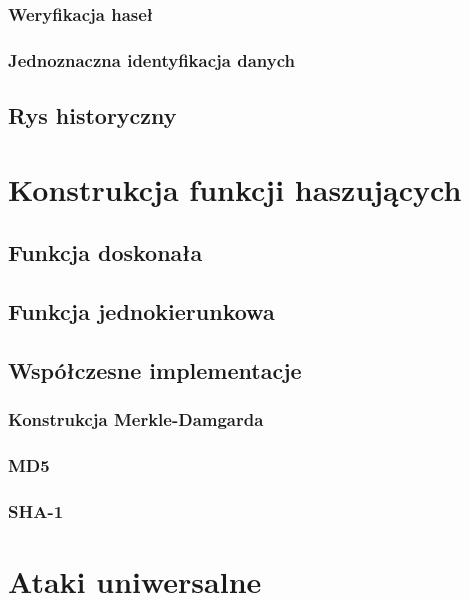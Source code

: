 \documentclass[12pt,a4paper,twoside]{article}
\begin{document}
\subsubsection{Weryfikacja haseł}

\subsubsection{Jednoznaczna identyfikacja danych}



\newpage

\subsection{Rys historyczny}

\section{Konstrukcja funkcji haszujących}

\subsection{Funkcja doskonała}

\subsection{Funkcja jednokierunkowa}

\subsection{Współczesne implementacje}

\subsubsection{Konstrukcja Merkle-Damgarda}

\subsubsection{MD5}

\subsubsection{SHA-1}

\section{Ataki uniwersalne}
\end{document}
